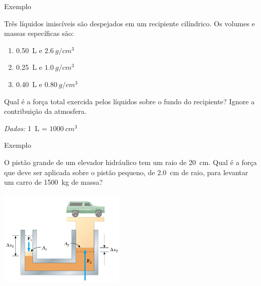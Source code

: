 \begin{frame}{Exemplo}
    \begin{minipage}{\textwidth}
        Três líquidos imiscíveis são despejados em um recipiente cilíndrico. Os volumes e
        massas específicas são:
        \begin{enumerate}
            \item \SI{0,50}{L} e \(\SI{2,6}{g/cm^3}\)
            \item \SI{0,25}{L} e \(\SI{1,0}{g/cm^3}\)
            \item \SI{0,40}{L} e \(\SI{0,80}{g/cm^3}\)
        \end{enumerate}
        Qual é a força total exercida pelos líquidos sobre o fundo do recipiente? Ignore
        a contribuição da atmosfera.
    \end{minipage}

    \vspace{1cm}
    \textit{Dados:} \SI{1}{L} =  \(\SI{1000}{cm^3}\)
\end{frame}

\begin{frame}{Exemplo}
    \begin{minipage}{\textwidth}
        O pistão grande de um elevador hidráulico tem um raio de \SI{20}{cm}. Qual é a força que deve ser aplicada sobre o pistão pequeno, de \SI{2.0}{cm} de raio, para levantar um carro de \SI{1500}{kg} de massa?
    \end{minipage}
    \begin{center}
        \includegraphics[width=0.45\textwidth]{images/pistao}
    \end{center}
\end{frame}

